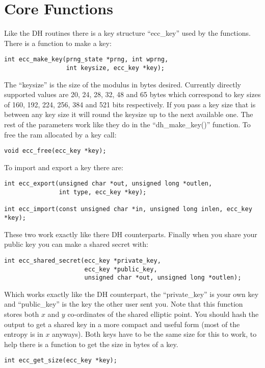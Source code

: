 \documentclass[b5paper]{book}
\begin{document}
\section{Core Functions}

Like the DH routines there is a key structure ``ecc\_key'' used by the functions.  There is a function to make a key:
\begin{verbatim}
int ecc_make_key(prng_state *prng, int wprng, 
                 int keysize, ecc_key *key);
\end{verbatim}

The ``keysize'' is the size of the modulus in bytes desired.  Currently directly supported values are 20, 24, 28, 32, 48 and 65 bytes which
correspond to key sizes of 160, 192, 224, 256, 384 and 521 bits respectively.  If you pass a key size that is between any key size
it will round the keysize up to the next available one.  The rest of the parameters work like they do in the ``dh\_make\_key()'' function.  
To free the ram allocated by a key call:
\begin{verbatim}
void ecc_free(ecc_key *key);
\end{verbatim}

To import and export a key there are: 
\begin{verbatim}
int ecc_export(unsigned char *out, unsigned long *outlen, 
               int type, ecc_key *key);

int ecc_import(const unsigned char *in, unsigned long inlen, ecc_key *key);
\end{verbatim}
These two work exactly like there DH counterparts.  Finally when you share your public key you can make a shared secret
with:
\begin{verbatim}
int ecc_shared_secret(ecc_key *private_key, 
                      ecc_key *public_key, 
                      unsigned char *out, unsigned long *outlen);
\end{verbatim}
Which works exactly like the DH counterpart, the ``private\_key'' is your own key and ``public\_key'' is the key the other
user sent you.   Note that this function stores both $x$ and $y$ co-ordinates of the shared
elliptic point.  You should hash the output to get a shared key in a more compact and useful form (most of the entropy is 
in $x$ anyways).  Both keys have to be the same size for this to work, to help there is a function to get the size in bytes
 of a key.
\begin{verbatim}
int ecc_get_size(ecc_key *key);
\end{verbatim}
\end{document}
